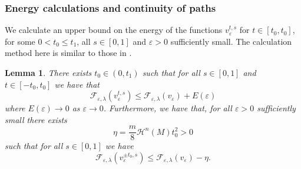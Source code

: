 \documentclass[11pt]{article}
\newtheorem{lem}{Lemma}
\begin{document}
\subsubsection{Energy calculations and continuity of paths}\label{subsec: energy calculations for shifted functions}

We calculate an upper bound on the energy of the functions $v^{t,s}_\varepsilon$ for $t \in [t_0,t_0]$, for some $0 < t_0 \leq t_1$, all $s \in [0,1]$ and $\varepsilon > 0$ sufficiently small. The calculation method here is similar to those in \cite[Sections 4, 6.1 and 7.1]{Bellettini-Workman}.

\begin{lem}\label{lem: shifting path upper energy bounds}
There exists $t_0 \in (0, t_1)$ such that for all $s \in [0,1]$ and $t \in [-t_0,t_0]$ we have that
\begin{equation*}
    \mathcal{F}_{\varepsilon,\lambda}(v^{t,s}_\varepsilon) \leq \mathcal{F}_{\varepsilon,\lambda}(v_\varepsilon) + E(\varepsilon)
\end{equation*}
where $E(\varepsilon) \rightarrow 0$ as $\varepsilon \rightarrow 0$. Furthermore, we have that, for all $\varepsilon > 0$ sufficiently small there exists
\begin{equation*}
    \eta = \frac{m}{8}\mathcal{H}^n(M)t_0^2> 0
\end{equation*} such that for all $s \in [0,1]$ we have
\begin{equation*}
    \mathcal{F}_{\varepsilon,\lambda}(v^{\pm t_0,s}_\varepsilon) \leq \mathcal{F}_{\varepsilon,\lambda}(v_\varepsilon) - \eta.
\end{equation*}
\end{lem}
\end{document}
